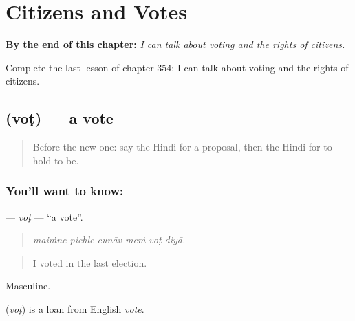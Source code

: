 
\chapter{Citizens and Votes}
\label{ch:hi-citizens-and-votes}

\begin{chapteropening}
\textbf{By the end of this chapter:} \emph{I can talk about voting and the rights of citizens.}

Complete the last lesson of chapter 354: I can talk about voting and the rights of citizens.
\end{chapteropening}

\section[\texorpdfstring{\hi{वोट} (voṭ)}{वोट (voṭ)}]{ (voṭ) — a vote}

\label{lesson:HI-C354-vot}



\begin{quote}
Before the new one: say the Hindi for a proposal, then the Hindi for to hold to be.
\end{quote}

\subsection*{You'll want to know: }
\textbf{} — \emph{voṭ} — \textquotedblleft{}a vote\textquotedblright{}.

\begin{quote}
     
\end{quote}

\begin{quote}
\emph{maiṁne pichle cunāv meṁ voṭ diyā.}
\end{quote}

\begin{quote}
I voted in the last election.
\end{quote}

Masculine.

\begin{cousinweb}
\textbf{} (\emph{voṭ}) is a loan from English \emph{vote}.
\end{cousinweb}

